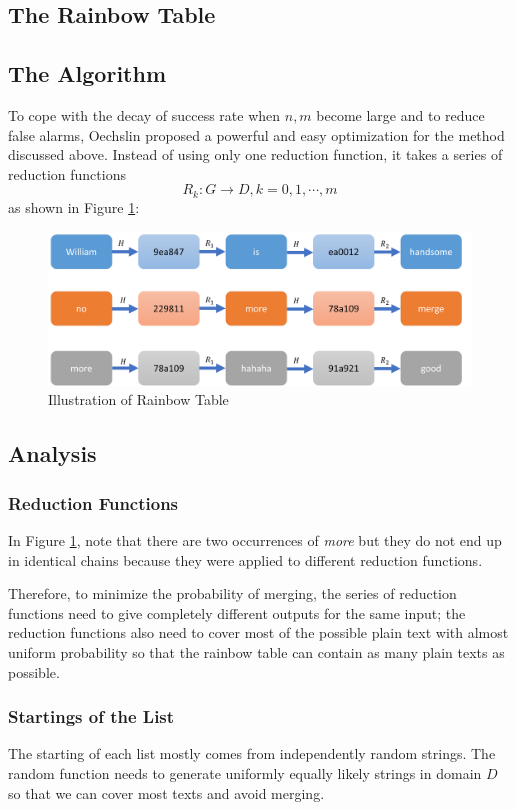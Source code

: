 \documentclass{article}
\begin{document}
\begin{multicols}{2}
\section{The Rainbow Table}
\subsection{The Algorithm}
To cope with the decay of success rate when $n,m$ become large and to reduce false alarms, Oechslin\cite{oechslin2003making} proposed a powerful and easy optimization for the method discussed above. Instead of using only one reduction function, it takes a series of reduction functions $$R_k: G \to D, k=0,1,\cdots,m$$ as shown in Figure \ref{fig:rainbowtable}:
\begin{figure}[H]
	\centering
	\includegraphics[width=\linewidth]{img/rainbowTable}
	\caption{Illustration of Rainbow Table}
	\label{fig:rainbowtable}
\end{figure}
\subsection{Analysis}
\subsubsection{Reduction Functions}
In Figure \ref{fig:rainbowtable}, note that there are two occurrences of \textit{more} but they do not end up in identical chains because they were applied to different reduction functions.

Therefore, to minimize the probability of merging, the series of reduction functions need to give completely different outputs for the same input; the reduction functions also need to cover most of the possible plain text with almost uniform probability so that the rainbow table can contain as many plain texts as possible.

\subsubsection{Startings of the List}
The starting of each list mostly comes from independently random strings. The random function needs to generate uniformly equally likely strings in domain $D$ so that we can cover most texts and avoid merging.

\end{multicols}
\end{document}
